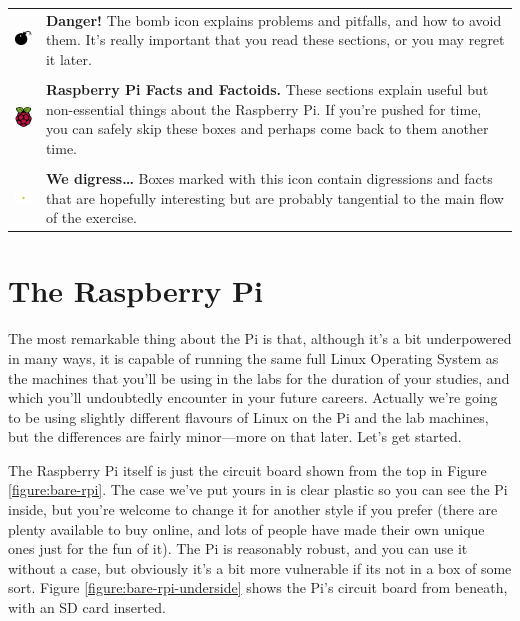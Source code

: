 \begin{tabular}{m{1.5cm}m{12cm}}
{\includegraphics[width=1.5cm]{images/bomb}} & \textbf{Danger!} The bomb icon explains problems and pitfalls, and how to avoid them. It's really important that you read these sections, or you may regret it later.\\
\\
\includegraphics[width=1.5cm]{images/rpi-logo} & \textbf{Raspberry Pi Facts and Factoids.} These sections explain useful but non-essential things about the Raspberry Pi. If you're pushed for time, you can safely skip these boxes and perhaps come back to them another time.\\
\\
\includegraphics[width=1.5cm]{images/diversion} & \textbf{We digress\ldots} Boxes marked with this icon contain digressions and facts that are hopefully interesting but are probably tangential to the main flow of the exercise.\\
\end{tabular}

\FloatBarrier 
\section{The Raspberry Pi}

The most remarkable thing about the Pi is that, although it's a bit underpowered in many ways, it is capable of running the same full Linux Operating System as the machines that you'll be using in the labs for the duration of your studies, and which you'll undoubtedly encounter in your future careers. Actually we're going to be using slightly different flavours of Linux on the Pi and the lab machines, but the differences are fairly minor---more on that later. Let's get started. 

The Raspberry Pi itself is just the circuit board shown from the top in Figure \ref{figure:bare-rpi}. The case we've put yours in is clear plastic so you can see the Pi inside, but you're welcome to change it for another style if you prefer (there are plenty available to buy online, and lots of people have made their own unique ones just for the fun of it). The Pi is reasonably robust, and you can use it without a case, but obviously it's a bit more vulnerable if its not in a box of some sort. Figure \ref{figure:bare-rpi-underside} shows the Pi's circuit board from beneath, with an SD card inserted.

